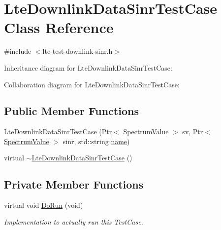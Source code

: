\hypertarget{classLteDownlinkDataSinrTestCase}{}\section{Lte\+Downlink\+Data\+Sinr\+Test\+Case Class Reference}
\label{classLteDownlinkDataSinrTestCase}


{\ttfamily \#include $<$lte-\/test-\/downlink-\/sinr.\+h$>$}



Inheritance diagram for Lte\+Downlink\+Data\+Sinr\+Test\+Case\+:


Collaboration diagram for Lte\+Downlink\+Data\+Sinr\+Test\+Case\+:
\subsection*{Public Member Functions}
\begin{DoxyCompactItemize}
\item 
\hyperlink{classLteDownlinkDataSinrTestCase_a6caca00c99b5d0fe7499a618e6b14b4a}{Lte\+Downlink\+Data\+Sinr\+Test\+Case} (\hyperlink{classns3_1_1Ptr}{Ptr}$<$ \hyperlink{classns3_1_1SpectrumValue}{Spectrum\+Value} $>$ sv, \hyperlink{classns3_1_1Ptr}{Ptr}$<$ \hyperlink{classns3_1_1SpectrumValue}{Spectrum\+Value} $>$ sinr, std\+::string \hyperlink{generate__test__data__lte__spectrum__model_8m_ab74e6bf80237ddc4109968cedc58c151}{name})
\item 
virtual \hyperlink{classLteDownlinkDataSinrTestCase_a7b50193929d2a15a98b0b7d99985c3c6}{$\sim$\+Lte\+Downlink\+Data\+Sinr\+Test\+Case} ()
\end{DoxyCompactItemize}
\subsection*{Private Member Functions}
\begin{DoxyCompactItemize}
\item 
virtual void \hyperlink{classLteDownlinkDataSinrTestCase_a8a0c7a49a353123eecb8a34f11e90051}{Do\+Run} (void)
\begin{DoxyCompactList}\small\item\em Implementation to actually run this Test\+Case. \end{DoxyCompactList}\end{DoxyCompactItemize}
